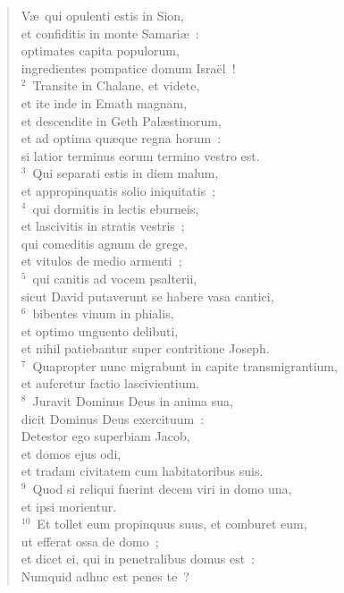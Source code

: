 \begin{flushleft}\begin{verse}\vspace{-19pt}V\ae\ qui opulenti estis in Sion,\\ et confiditis in monte Samari\ae~:\\ optimates capita populorum,\\ ingredientes pompatice domum Isra\"el~!\\
${}^{2}$~Transite in Chalane, et videte,\\ et ite inde in Emath magnam,\\ et descendite in Geth Pal\ae stinorum,\\ et ad optima qu\ae que regna horum~:\\ si latior terminus eorum termino vestro est.\\
${}^{3}$~Qui separati estis in diem malum,\\ et appropinquatis solio iniquitatis~;\\
${}^{4}$~qui dormitis in lectis eburneis,\\ et lascivitis in stratis vestris~;\\ qui comeditis agnum de grege,\\ et vitulos de medio armenti~;\\
${}^{5}$~qui canitis ad vocem psalterii,\\ sicut David putaverunt se habere vasa cantici,\\
${}^{6}$~bibentes vinum in phialis,\\ et optimo unguento delibuti,\\ et nihil patiebantur super contritione Joseph.\\
${}^{7}$~Quapropter nunc migrabunt in capite transmigrantium,\\ et auferetur factio lascivientium.\\
${}^{8}$~Juravit Dominus Deus in anima sua,\\ dicit Dominus Deus exercituum~:\\ Detestor ego superbiam Jacob,\\ et domos ejus odi,\\ et tradam civitatem cum habitatoribus suis.\\
${}^{9}$~Quod si reliqui fuerint decem viri in domo una,\\ et ipsi morientur.\\
${}^{10}$~Et tollet eum propinquus suus, et comburet eum,\\ ut efferat ossa de domo~;\\ et dicet ei, qui in penetralibus domus est~:\\ Numquid adhuc est penes te~?\\

\end{verse}
\end{flushleft}
